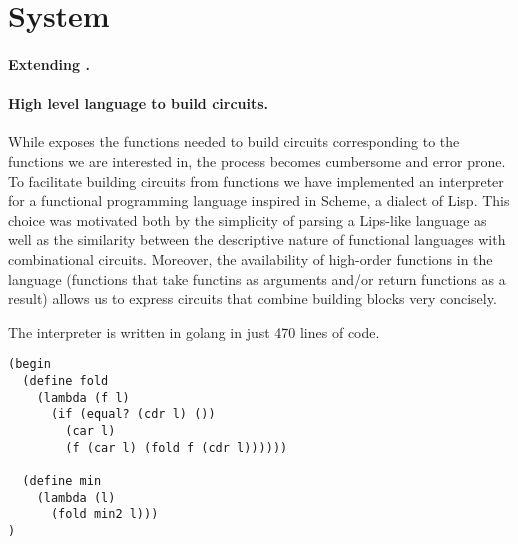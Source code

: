 \section{System}
\label{sec:system}

\paragraph{Extending \libgarble.}





\paragraph{High level language to build circuits.}

While \libgarble exposes the functions needed to build circuits corresponding to
the functions we are interested in, the process becomes cumbersome and error
prone.  To facilitate building circuits from functions we have implemented an
interpreter for a functional programming language inspired in Scheme, a dialect
of Lisp.  This choice was motivated both by the simplicity of parsing a
Lips-like language as well as the similarity between the descriptive nature of
functional languages with combinational circuits.  Moreover, the availability
of high-order functions in the language (functions that take functins as
arguments and/or return functions as a result) allows us to express circuits
that combine building blocks very concisely.

The interpreter is written in golang in just 470 lines of code.

\begin{lstlisting}
(begin
  (define fold
    (lambda (f l)
      (if (equal? (cdr l) ())
        (car l)
        (f (car l) (fold f (cdr l))))))

  (define min
    (lambda (l)
      (fold min2 l)))
)
\end{lstlisting}

